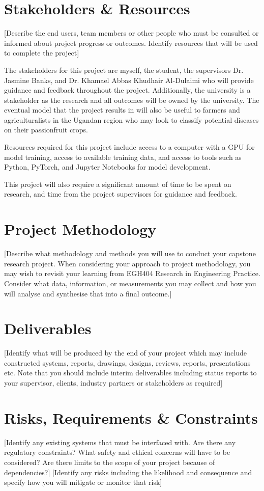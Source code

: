 \documentclass[11pt]{article}
\begin{document}
\section{Stakeholders \& Resources}
[Describe the end users, team members or other people who must be consulted or informed about
project progress or outcomes. Identify resources that will be used to complete the project]

The stakeholders for this project are myself, the student, the supervisors Dr. Jasmine Banks, 
and Dr. Khamael Abbas Khudhair Al-Dulaimi who will provide guidance and feedback
throughout the project. Additionally, the university is a stakeholder as the research
and all outcomes will be owned by the university. The eventual model that the project
results in will also be useful to farmers and agriculturalists in the Ugandan 
region who may look to classify potential diseases on their passionfruit crops.

Resources required for this project include access to a computer with a GPU for 
model training, access to available training data, and access to tools such as 
Python, PyTorch, and Jupyter Notebooks for model development.

This project will also require a significant amount of time to be spent on research,
and time from the project supervisors for guidance and feedback.


\section{Project Methodology}
[Describe what methodology and methods you will use to conduct your capstone research project.
When considering your approach to project methodology, you may wish to revisit your learning from
EGH404 Research in Engineering Practice. Consider what data, information, or measurements you
may collect and how you will analyse and synthesise that into a final outcome.]

\section{Deliverables}
[Identify what will be produced by the end of your project which may include constructed systems,
reports, drawings, designs, reviews, reports, presentations etc. Note that you should include interim
deliverables including status reports to your supervisor, clients, industry partners or stakeholders as
required]

\section{Risks, Requirements \& Constraints}
[Identify any existing systems that must be interfaced with. Are there any regulatory constraints?
What safety and ethical concerns will have to be considered? Are there limits to the scope of your
project because of dependencies?]
[Identify any risks including the likelihood and consequence and specify how you will mitigate or
monitor that risk]
\end{document}
